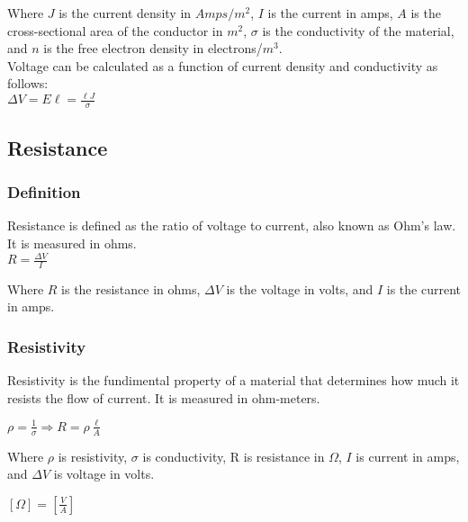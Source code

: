 Where $J$ is the current density in $Amps/m^2$, $I$ is the current in amps, $A$ is the cross-sectional 
area of the conductor in $m^2$, $\sigma$ is the conductivity of the material, and $n$ is the free electron 
density in electrons/$m^3$.\\

Voltage can be calculated as a function of current density and conductivity as follows:\\
\vbox{
    \large\center
    $\Delta V = E\ell = \frac{\ell J}{\sigma}$
}
\vspace{12pt}
\hrulefill

\begin{center}
\subsection*{Resistance}
\end{center}

\subsubsection*{Definition}
Resistance is defined as the ratio of voltage to current, also known as Ohm's law. It is measured in ohms.\\

\vbox{
    \large\center
    $R = \frac{\Delta V}{I}$
}\vspace{12pt}

Where $R$ is the resistance in ohms, $\Delta V$ is the voltage in volts, and $I$ is the current in amps.\\


\subsubsection*{Resistivity}

\hspace{.5cm} Resistivity is the fundimental property of a material that determines how much it resists the flow of current. 
It is measured in ohm-meters.

\vbox {
    \large\center
    $\rho = \frac{1}{\sigma} \Rightarrow R = \rho \frac{\ell}{A}$
}\vspace{12pt}

Where $\rho$ is resistivity, $\sigma$ is conductivity, R is resistance in $\Omega$, $I$ is current in amps, and $\Delta V$ is voltage in volts.

\vbox {
    \large\center
    $[\Omega] = [\frac{V}{A}]$
}\vspace{12pt}

